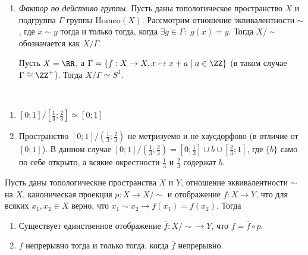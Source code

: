 \documentclass[12pt,a4paper]{article}
\newcommand{\Homeo}{\ensuremath{\mathrm{Homeo}}\xspace}
\begin{document}
\begin{definition}
\begin{enumerate}
            \item \emph{Фактор по действию группы.} Пусть даны топологическое пространство $X$ и подгруппа $\Gamma$ группы $\Homeo(X)$. Рассмотрим отношение эквивалентности $\sim$, где $x \sim y$ тогда и только тогда, когда $\exists g \in \Gamma:\; g(x) = y$. Тогда $X/{\sim}$ обозначается как $X/\Gamma$.
            \begin{example}
                Пусть $X = \RR$, а $\Gamma = \{f: X \to X, x \mapsto x + a \mid a \in \ZZ\}$ (в таком случае $\Gamma \cong \ZZ^+$). Тогда $X/\Gamma \simeq S^1$.
            \end{example}
        \end{enumerate}
    \end{definition}

    \begin{example}\ 
        \begin{enumerate}
            \item $[0; 1]/[\frac{1}{3}; \frac{2}{3}] \simeq [0; 1]$
            \item Пространство $[0; 1]/(\frac{1}{3}; \frac{2}{3})$ не метризуемо и не хаусдорфово (в отличие от $[0; 1]$). В данном случае $[0; 1]/(\frac{1}{3}; \frac{2}{3}) = [0; \frac{1}{3}] \cup {b} \cup [\frac{2}{3}; 1]$, где $\{b\}$ само по себе открыто, а всякие окрестности $\frac{1}{3}$ и $\frac{2}{3}$ содержат $b$.
        \end{enumerate}
    \end{example}

    \begin{theorem}
        Пусть даны топологические пространства $X$ и $Y$, отношение эквивалентности $\sim$ на $X$, каноническая проекция $p: X \to X/{\sim}$ и отображение $f: X \to Y$, что для всяких $x_1, x_2 \in X$ верно, что $x_1 \sim x_2 \rightarrow f(x_1) = f(x_2)$. Тогда
        \begin{enumerate}
            \item Существует единственное отображение $\overline{f}: X/{\sim} \to Y$, что $f = \overline{f} \circ p$.
            \item $f$ непрерывно тогда и только тогда, когда $\overline{f}$ непрерывно.
        \end{enumerate}
    \end{theorem}
\end{document}
